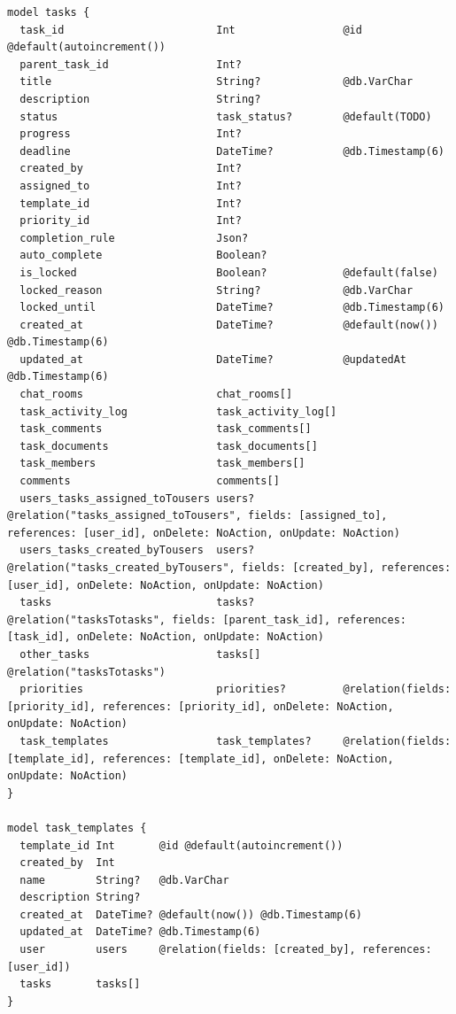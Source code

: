 \begin{listing}[H]
\begin{verbatim}
model tasks {
  task_id                        Int                 @id @default(autoincrement())
  parent_task_id                 Int?
  title                          String?             @db.VarChar
  description                    String?
  status                         task_status?        @default(TODO)
  progress                       Int?
  deadline                       DateTime?           @db.Timestamp(6)
  created_by                     Int?
  assigned_to                    Int?
  template_id                    Int?
  priority_id                    Int?
  completion_rule                Json?
  auto_complete                  Boolean?
  is_locked                      Boolean?            @default(false)
  locked_reason                  String?             @db.VarChar
  locked_until                   DateTime?           @db.Timestamp(6)
  created_at                     DateTime?           @default(now()) @db.Timestamp(6)
  updated_at                     DateTime?           @updatedAt @db.Timestamp(6)
  chat_rooms                     chat_rooms[]
  task_activity_log              task_activity_log[]
  task_comments                  task_comments[]
  task_documents                 task_documents[]
  task_members                   task_members[]
  comments                       comments[]
  users_tasks_assigned_toTousers users?              @relation("tasks_assigned_toTousers", fields: [assigned_to], references: [user_id], onDelete: NoAction, onUpdate: NoAction)
  users_tasks_created_byTousers  users?              @relation("tasks_created_byTousers", fields: [created_by], references: [user_id], onDelete: NoAction, onUpdate: NoAction)
  tasks                          tasks?              @relation("tasksTotasks", fields: [parent_task_id], references: [task_id], onDelete: NoAction, onUpdate: NoAction)
  other_tasks                    tasks[]             @relation("tasksTotasks")
  priorities                     priorities?         @relation(fields: [priority_id], references: [priority_id], onDelete: NoAction, onUpdate: NoAction)
  task_templates                 task_templates?     @relation(fields: [template_id], references: [template_id], onDelete: NoAction, onUpdate: NoAction)
}

model task_templates {
  template_id Int       @id @default(autoincrement())
  created_by  Int
  name        String?   @db.VarChar
  description String?
  created_at  DateTime? @default(now()) @db.Timestamp(6)
  updated_at  DateTime? @db.Timestamp(6)
  user        users     @relation(fields: [created_by], references: [user_id])
  tasks       tasks[]
}


\end{verbatim}
\end{listing}
